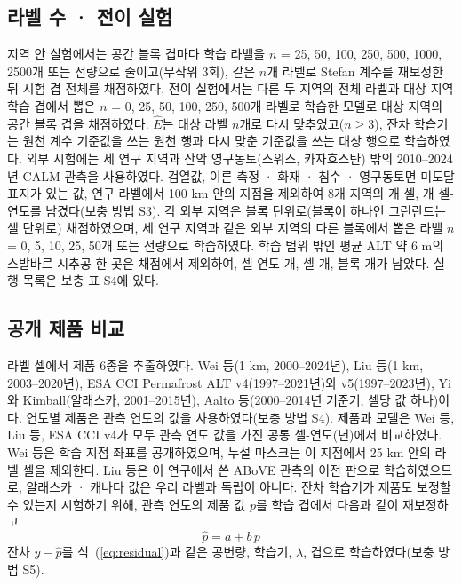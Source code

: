 \subsection{라벨 수 · 전이 실험}
지역 안 실험에서는 공간 블록 겹마다 학습 라벨을 $n$ = 25, 50, 100, 250, 500, 1000, 2500개 또는 전량으로 줄이고(무작위 3회), 같은 $n$개 라벨로 Stefan 계수를 재보정한 뒤 시험 겹 전체를 채점하였다. 전이 실험에서는 다른 두 지역의 전체 라벨과 대상 지역 학습 겹에서 뽑은 $n$ = 0, 25, 50, 100, 250, 500개 라벨로 학습한 모델로 대상 지역의 공간 블록 겹을 채점하였다. $\hat{E}$는 대상 라벨 $n$개로 다시 맞추었고($n\geq3$), 잔차 학습기는 원천 계수 기준값을 쓰는 원천 행과 다시 맞춘 기준값을 쓰는 대상 행으로 학습하였다. 외부 시험에는 세 연구 지역과 산악 영구동토(스위스, 카자흐스탄) 밖의 2010--2024년 CALM 관측\cite{Streletskiy2025}을 사용하였다. 검열값, 이른 측정 · 화재 · 침수 · 영구동토면 미도달 표지가 있는 값, 연구 라벨에서 100 km 안의 지점을 제외하여 8개 지역의 \nextcells{}개 셀, \nextcy{}개 셀-연도를 남겼다(보충 방법 S3). 각 외부 지역은 블록 단위로(블록이 하나인 그린란드는 셀 단위로) 채점하였으며, 세 연구 지역과 같은 외부 지역의 다른 블록에서 뽑은 라벨 $n$ = 0, 5, 10, 25, 50개 또는 전량으로 학습하였다. 학습 범위 밖인 평균 ALT 약 6 m의 스발바르 시추공 한 곳은 채점에서 제외하여, 셀-연도 \nftScoredRows{}개, 셀 \nftScoredCells{}개, 블록 \nftScoredBlocks{}개가 남았다. 실행 목록은 보충 표 S4에 있다.

\subsection{공개 제품 비교}
라벨 셀에서 제품 6종을 추출하였다. Wei 등\cite{Wei2026}(1 km, 2000--2024년), Liu 등\cite{Liu2024}(1 km, 2003--2020년), ESA CCI Permafrost ALT v4(1997--2021년)와 v5(1997--2023년)\cite{Westermann2024,Westermann2025}, Yi와 Kimball\cite{YiKimball2019}(알래스카, 2001--2015년), Aalto 등\cite{Aalto2018}(2000--2014년 기준기, 셀당 값 하나)이다. 연도별 제품은 관측 연도의 값을 사용하였다(보충 방법 S4). 제품과 모델은 Wei 등, Liu 등, ESA CCI v4가 모두 관측 연도 값을 가진 공통 셀-연도(\nyrscc{}년)에서 비교하였다. Wei 등은 학습 지점 좌표를 공개하였으며, 누설 마스크는 이 지점에서 25 km 안의 라벨 셀을 제외한다. Liu 등은 이 연구에서 쓴 ABoVE 관측의 이전 판으로 학습하였으므로\cite{Liu2024}, 알래스카 · 캐나다 값은 우리 라벨과 독립이 아니다. 잔차 학습기가 제품도 보정할 수 있는지 시험하기 위해, 관측 연도의 제품 값 $p$를 학습 겹에서 다음과 같이 재보정하고
\begin{equation}
\hat{p} = a + b\, p
\label{eq:prod}
\end{equation}
잔차 $y-\hat{p}$를 식~(\ref{eq:residual})과 같은 공변량, 학습기, $\lambda$, 겹으로 학습하였다(보충 방법 S5).

